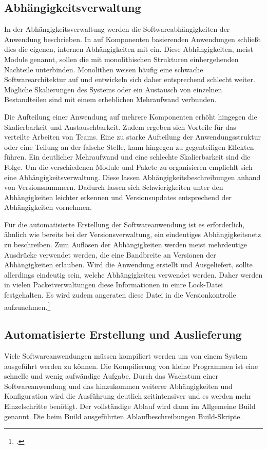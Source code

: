 \subsection{Abhängigkeitsverwaltung}

In der Abhängigkeitsverwaltung werden die Softwareabhängigkeiten der Anwendung beschrieben. In auf  Komponenten 
basierenden Anwendungen schließt dies die eigenen, internen Abhängigkeiten mit ein. Diese Abhängigkeiten, meist Module 
genannt, sollen die mit monolithischen Strukturen einhergehenden Nachteile unterbinden. Monolithen weisen häufig eine 
schwache Softwarearchitektur auf und entwickeln sich daher entsprechend schlecht weiter. Mögliche Skalierungen des 
Systems oder ein Austausch von einzelnen Bestandteilen sind mit einem erheblichen Mehraufwand verbunden.

Die Aufteilung einer Anwendung auf mehrere Komponenten erhöht hingegen die Skalierbarkeit und Austauschbarkeit. Zudem 
ergeben sich Vorteile für das verteilte Arbeiten von Teams. 
Eine zu starke Aufteilung der Anwendungsstruktur oder eine Teilung an der falsche Stelle, kann hingegen zu gegenteiligen 
Effekten führen. Ein deutlicher Mehraufwand und eine schlechte Skalierbarkeit sind die Folge. Um die verschiedenen Module 
und Pakete zu organisieren empfiehlt sich eine Abhängigkeitsverwaltung. Diese lassen Abhängigkeitsbeschreibungen anhand 
von Versionsnummern. Dadurch lassen sich Schwierigkeiten unter den Abhängigkeiten leichter erkennen und Versionsupdates 
entsprechend der Abhängigkeiten vornehmen.

Für die automatisierte Erstellung der Softwareanwendung ist es erforderlich, ähnlich wie bereits bei der 
Versionsverwaltung, ein eindeutiges Abhängigkeitsnetz zu beschreiben. Zum Auflösen der Abhängigkeiten werden meist 
mehrdeutige Ausdrücke verwendet werden, die eine Bandbreite an Versionen der Abhängigkeiten erlauben. Wird die Anwendung 
erstellt und Ausgeliefert, sollte allerdings eindeutig sein, welche Abhängigkeiten verwendet werden. Daher werden in 
vielen Packetverwaltungen diese Informationen in einre Lock-Datei festgehalten. Es wird zudem angeraten diese Datei in 
die Versionkontrolle aufzunehmen.\footcite{composer-why-lock-in-vcs}

\subsection{Automatisierte Erstellung und Auslieferung}

Viele Softwareanwendungen müssen kompiliert werden um von einem System ausgeführt werden zu können. Die Kompilierung von kleine Programmen ist eine schnelle und wenig aufwändige Aufgabe. Durch das Wachstum einer Softwareanwendung und das hinzukommen weiterer Abhängigkeiten und Konfiguration wird die Ausführung deutlich zeitintensiver und es werden mehr Einzelschritte benötigt. Der vollständige Ablauf wird dann im Allgemeine Build genannt. Die beim Build ausgeführten Ablaufbeschreibungen Build-Skripte. 

